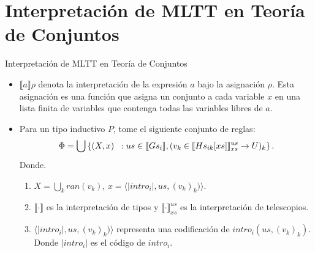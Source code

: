 \documentclass[dvipsnames, 8pt]{beamer} %
\theoremstyle{plain}
\theoremstyle{definition}
\begin{document}
\section{Interpretación de MLTT en Teoría de Conjuntos}

\begin{frame}{Interpretación de MLTT en Teoría de Conjuntos}
    \begin{itemize}
        \item $\llbracket a \rrbracket\rho$ denota la interpretación de la expresión $a$ bajo la asignación $\rho$. Esta asignación es una función que asigna un conjunto a cada variable $x$ en una lista finita de variables que contenga todas las variables libres de $a$.\pause
        \item Para un tipo inductivo $P$, tome el siguiente conjunto de reglas:\pause    
        \begin{align*}
            \Phi = \bigcup \left\{\left(X, x\right)\hspace{2mm}: us\in\llbracket Gs_{i}\rrbracket, (v_k\in \llbracket Hs_{ik}[xs]\rrbracket_{xs}^{us}\to U)_{k} \right\}.
        \end{align*}
        Donde.
        \begin{enumerate}
            \item $ X = \bigcup_{k} ran(v_{k})$, $x = \langle |intro_{i}|, us, (v_{k})_{k})\rangle$.\pause
            \item $\llbracket\cdot\rrbracket$ es la interpretación de tipos y $\llbracket\cdot\rrbracket_{xs}^{us}$ es la interpretación de telescopios.\pause
            \item $ \langle |intro_{i}|, us, (v_{k})_{k})\rangle$ representa una codificación de $intro_{i}(us,(v_{k})_{k})$. Donde $|intro_{i}|$ es el código de $intro_{i}$.
        \end{enumerate}
    \end{itemize}
\end{frame}
\end{document}
